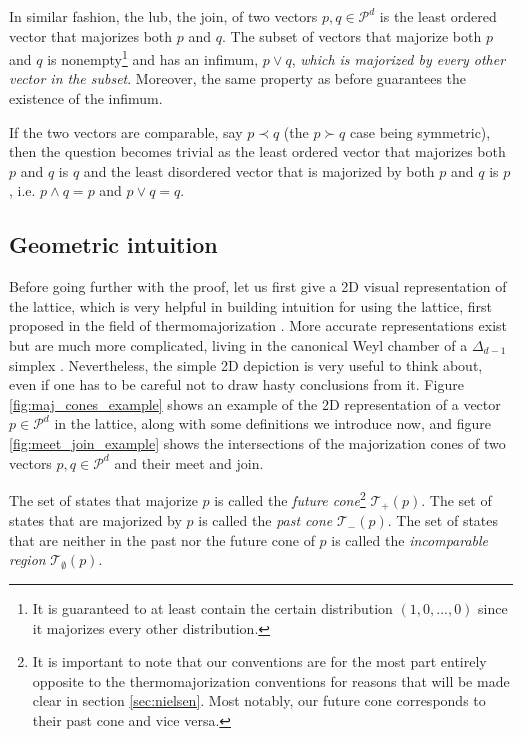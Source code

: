 In similar fashion, the lub, the join, of two vectors $p, q \in \mathcal{P}^d$ is the least ordered vector that majorizes both $p$ and $q$. The subset of vectors that majorize both $p$ and $q$ is nonempty\footnote{It is guaranteed to at least contain the certain distribution $(1, 0, ..., 0)$ since it majorizes every other distribution.} and has an infimum, $p \vee q$, \textit{which is majorized by every other vector in the subset}. Moreover, the same property as before guarantees the existence of the infimum.

If the two vectors are comparable, say $p \prec q$ (the $p \succ q$ case being symmetric), then the question becomes trivial as the least ordered vector that majorizes both $p$ and $q$ is $q$ and the least disordered vector that is majorized by both $p$ and $q$ is $p$, i.e. $p \wedge q = p$ and $p \vee q = q$.



\subsection{Geometric intuition}

Before going further with the proof, let us first give a 2D visual representation of the lattice, which is very helpful in building intuition for using the lattice, first proposed in the field of thermomajorization \cite{korzekwa_structure_2017}. More accurate representations exist but are much more complicated, living in the canonical Weyl chamber of a $\Delta_{d-1}$ simplex \cite{junior_geometric_2022}. Nevertheless, the simple 2D depiction is very useful to think about, even if one has to be careful not to draw hasty conclusions from it. Figure \ref{fig:maj_cones_example} shows an example of the 2D representation of a vector $p \in \mathcal{P}^d$ in the lattice, along with some definitions we introduce now, and figure \ref{fig:meet_join_example} shows the intersections of the majorization cones of two vectors $p, q \in \mathcal{P}^d$ and their meet and join.

\begin{definition}
    The set of states that majorize $p$ is called the \textit{future cone}\footnote{It is important to note that our conventions are for the most part entirely opposite to the thermomajorization conventions for reasons that will be made clear in section \ref{sec:nielsen}. Most notably, our future cone corresponds to their past cone and vice versa.}  $\mathcal{T}_+ (p)$. The set of states that are majorized by $p$ is called the \textit{past cone} $\mathcal{T}_- (p)$. The set of states that are neither in the past nor the future cone of $p$ is called the \textit{incomparable region} $\mathcal{T}_\emptyset (p)$.
\end{definition}

